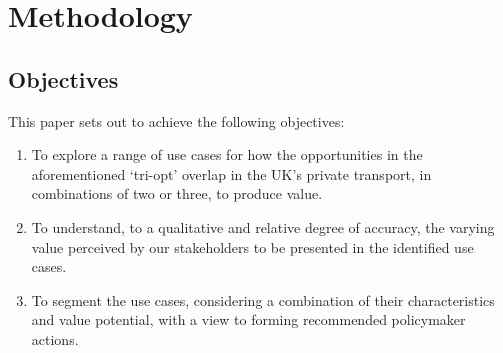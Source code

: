 \documentclass[journal]{IEEEtran}
\begin{document}



\section{Methodology}\label{methodology}

\subsection{Objectives}

This paper sets out to achieve the following objectives:

\begin{enumerate}
\item To explore a range of use cases for how the opportunities in the
  aforementioned `tri-opt' overlap in the UK's private transport, in
  combinations of two or three, to produce value.  
\item To understand, to a qualitative and relative degree of accuracy,
  the varying value perceived by our stakeholders to be presented in
  the identified use cases. 
\item To segment the use cases, considering a combination of their
  characteristics and value potential, with a view to forming
  recommended policymaker actions.
\end{enumerate}
\end{document}
